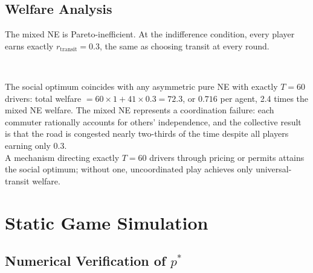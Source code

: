 \subsection{Welfare Analysis}

The mixed NE is Pareto-inefficient. At the indifference condition, every player earns exactly $r_{\text{transit}} = 0.3$, the same as choosing transit at every round. \\

\begin{table}[H]
\centering
\small
{} \\
\caption{Welfare comparison across strategy profiles and equilibria}
\label{tab:welfare}
\end{table}

The social optimum coincides with any asymmetric pure NE with exactly $T=60$ drivers: total welfare $= 60 \times 1 + 41 \times 0.3 = 72.3$, or $0.716$ per agent, 2.4 times the mixed NE welfare. The mixed NE represents a coordination failure: each commuter rationally accounts for others' independence, and the collective result is that the road is congested nearly two-thirds of the time despite all players earning only $0.3$. \\

A mechanism directing exactly $T=60$ drivers through pricing or permits attains the social optimum; without one, uncoordinated play achieves only universal-transit welfare. \\

\section{Static Game Simulation}

\subsection{Numerical Verification of $p^*$}

